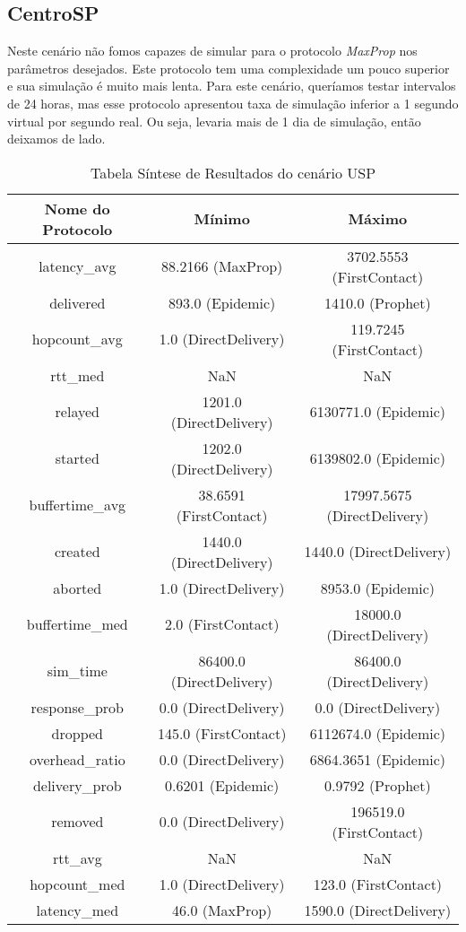 \documentclass[conference]{IEEEtran}
\begin{document}
\subsection{CentroSP}
Neste cenário não fomos capazes de simular para o protocolo \emph{MaxProp} nos parâmetros desejados. Este protocolo tem uma complexidade um pouco superior e sua simulação é muito mais lenta. Para este cenário, queríamos testar intervalos de 24 horas, mas esse protocolo apresentou taxa de simulação inferior a 1 segundo virtual por segundo real. Ou seja, levaria mais de 1 dia de simulação, então deixamos de lado.

\begin{table}[!t]
\caption{Tabela Síntese de Resultados do cenário USP}
\label{table:usp}
\centering
\begin{tabular}{|c|c c|}
  \hline
  Nome do Protocolo & Mínimo & Máximo \\
  \hline
  latency\_avg & 88.2166 (MaxProp) & 3702.5553 (FirstContact) \\
  delivered & 893.0 (Epidemic) & 1410.0 (Prophet) \\
  hopcount\_avg & 1.0 (DirectDelivery) & 119.7245 (FirstContact) \\
  rtt\_med & NaN & NaN \\
  relayed & 1201.0 (DirectDelivery) & 6130771.0 (Epidemic) \\
  started & 1202.0 (DirectDelivery) & 6139802.0 (Epidemic) \\
  buffertime\_avg & 38.6591 (FirstContact) & 17997.5675 (DirectDelivery) \\
  created & 1440.0 (DirectDelivery) & 1440.0 (DirectDelivery) \\
  aborted & 1.0 (DirectDelivery) & 8953.0 (Epidemic) \\
  buffertime\_med & 2.0 (FirstContact) & 18000.0 (DirectDelivery) \\
  sim\_time & 86400.0 (DirectDelivery) & 86400.0 (DirectDelivery) \\
  response\_prob & 0.0 (DirectDelivery) & 0.0 (DirectDelivery) \\
  dropped & 145.0 (FirstContact) & 6112674.0 (Epidemic) \\
  overhead\_ratio & 0.0 (DirectDelivery) & 6864.3651 (Epidemic) \\
  delivery\_prob & 0.6201 (Epidemic) & 0.9792 (Prophet) \\
  removed & 0.0 (DirectDelivery) & 196519.0 (FirstContact) \\
  rtt\_avg & NaN & NaN \\
  hopcount\_med & 1.0 (DirectDelivery) & 123.0 (FirstContact) \\
  latency\_med & 46.0 (MaxProp) & 1590.0 (DirectDelivery) \\
  \hline
\end{tabular}
\end{table}
\end{document}
